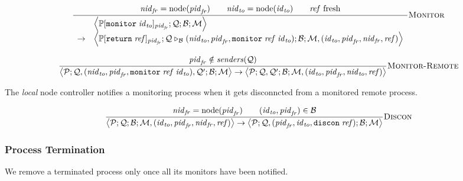 \documentclass{article}
\newcommand{\sReturn}{\mathtt{return}}
\newcommand{\sMonitor}{\mathtt{monitor}}
\DeclareMathOperator{\sNodeOf}{node}
\newcommand{\sExtend}[1]{\mathrel{\triangleright_{#1}}}
\newcommand{\sNid}{\ensuremath{\mathit{nid}}}
\newcommand{\sPid}{\ensuremath{\mathit{pid}}}
\newcommand{\sId}{\ensuremath{\mathit{id}}}
\newcommand{\sRef}{\ensuremath{\mathit{ref}}}
\newcommand{\sSystem}[4]{\left\langle #1 ; #2 ; #3 ; #4 \right\rangle}
\newcommand{\sQueue}{\mathcal{Q}}
\newcommand{\sProcesses}{\mathcal{P}}
\newcommand{\sBlacklist}{\mathcal{B}}
\newcommand{\sMonitors}{\mathcal{M}}
\newcommand{\sCtxt}[1]{\mathbb{#1}}
\newcommand{\sSenders}{\mathit{senders}}
\begin{document}
\begin{equation*}
\frac{
  \sNid_\mathit{fr} = \sNodeOf(\sPid_\mathit{fr}) 
\qquad
  \sNid_\mathit{to} = \sNodeOf(\sId_\mathit{to})
\qquad
  \sRef \text{ fresh}
}{
\begin{array}{ll}
& \sSystem{\sCtxt{P}[ \sMonitor \; \sId_\mathit{to} ]_{\sPid_\mathit{fr}}}
          {\sQueue}
          {\sBlacklist}
          {\sMonitors}
\\         
\rightarrow &
  \sSystem{\sCtxt{P}[ \sReturn \; \sRef ]_{\sPid_\mathit{fr}}}
          {\sQueue \sExtend{\sBlacklist} (\sNid_\mathit{to}, \sPid_\mathit{fr}, \sMonitor \; \sRef \; \sId_\mathit{to})}
          {\sBlacklist}
          {\sMonitors, (\sId_\mathit{to}, \sPid_\mathit{fr}, \sNid_\mathit{fr}, \sRef)}
\end{array}
} \textsc{Monitor}
\end{equation*}

\begin{equation*}
\frac{
  \sPid_\mathit{fr} \notin \sSenders(\sQueue)
}{
  \sSystem{\sProcesses}
          {\sQueue, (\sNid_\mathit{to}, \sPid_\mathit{fr}, \sMonitor \; \sRef \; \sId_\mathit{to}), \sQueue'}
          {\sBlacklist}
          {\sMonitors}
\rightarrow          
  \sSystem{\sProcesses}
          {\sQueue, \sQueue'}
          {\sBlacklist}
          {\sMonitors, (\sId_\mathit{to}, \sPid_\mathit{fr}, \sNid_\mathit{to}, \sRef)}
} \textsc{Monitor-Remote}
\end{equation*}

The \emph{local} node controller notifies a monitoring process when it gets
disconncted from a monitored remote process.

\begin{equation*}
\frac{
  \sNid_\mathit{fr} = \sNodeOf(\sPid_\mathit{fr})
\qquad
  (\sId_\mathit{to}, \sPid_\mathit{fr}) \in \sBlacklist
}{
  \sSystem{\sProcesses}
          {\sQueue}
          {\sBlacklist}
          {\sMonitors, (\sId_\mathit{to}, \sPid_\mathit{fr}, \sNid_\mathit{fr}, \sRef)}
\rightarrow          
  \sSystem{\sProcesses}
          {\sQueue, (\sPid_\mathit{fr}, \sId_\mathit{to}, \mathtt{discon} \; \sRef)}
          {\sBlacklist}
          {\sMonitors}
} \textsc{Discon}
\end{equation*}

\subsubsection{Process Termination}

We remove a terminated process only once all its monitors have been notified.
\end{document}
